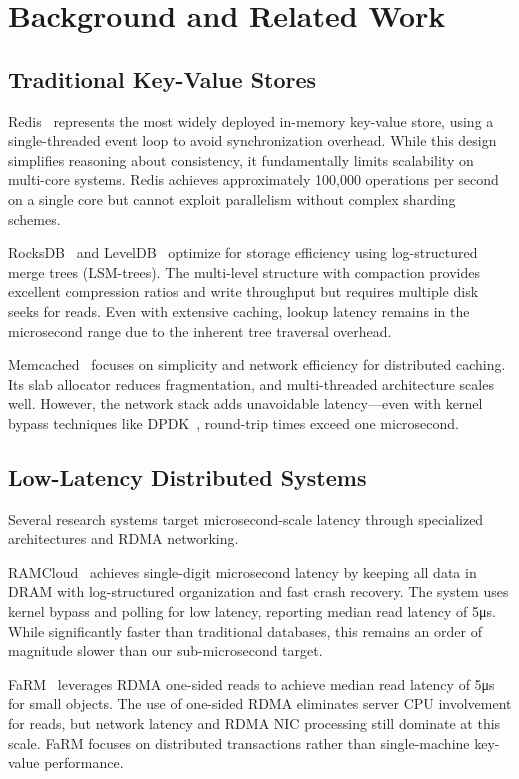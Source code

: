 \documentclass[10pt,conference]{IEEEtran}
\begin{document}
\section{Background and Related Work}
\label{sec:background}

\subsection{Traditional Key-Value Stores}

Redis~\cite{redis} represents the most widely deployed in-memory key-value store, using a single-threaded event loop to avoid synchronization overhead. While this design simplifies reasoning about consistency, it fundamentally limits scalability on multi-core systems. Redis achieves approximately 100,000 operations per second on a single core but cannot exploit parallelism without complex sharding schemes.

RocksDB~\cite{rocksdb} and LevelDB~\cite{leveldb} optimize for storage efficiency using log-structured merge trees (LSM-trees). The multi-level structure with compaction provides excellent compression ratios and write throughput but requires multiple disk seeks for reads. Even with extensive caching, lookup latency remains in the microsecond range due to the inherent tree traversal overhead.

Memcached~\cite{memcached} focuses on simplicity and network efficiency for distributed caching. Its slab allocator reduces fragmentation, and multi-threaded architecture scales well. However, the network stack adds unavoidable latency—even with kernel bypass techniques like DPDK~\cite{dpdk}, round-trip times exceed one microsecond.

\subsection{Low-Latency Distributed Systems}

Several research systems target microsecond-scale latency through specialized architectures and RDMA networking.

RAMCloud~\cite{ramcloud} achieves single-digit microsecond latency by keeping all data in DRAM with log-structured organization and fast crash recovery. The system uses kernel bypass and polling for low latency, reporting median read latency of 5μs. While significantly faster than traditional databases, this remains an order of magnitude slower than our sub-microsecond target.

FaRM~\cite{farm} leverages RDMA one-sided reads to achieve median read latency of 5μs for small objects. The use of one-sided RDMA eliminates server CPU involvement for reads, but network latency and RDMA NIC processing still dominate at this scale. FaRM focuses on distributed transactions rather than single-machine key-value performance.
\end{document}
